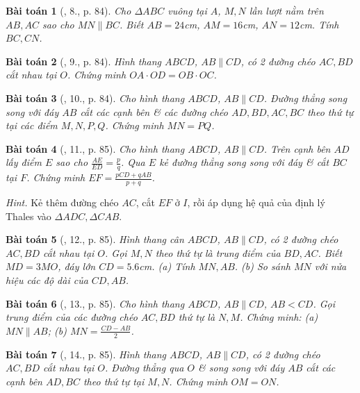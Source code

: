 \documentclass{article}
\newtheorem{baitoan}{Bài toán}
\begin{document}
\begin{baitoan}[\cite{SBT_Toan_8_tap_2}, 8., p. 84]
	Cho $\Delta ABC$ vuông tại $A$, $M,N$ lần lượt nằm trên $AB,AC$ sao cho $MN\parallel BC$. Biết $AB = 24$\emph{cm}, $AM = 16$\emph{cm}, $AN = 12$\emph{cm}. Tính $BC,CN$.
\end{baitoan}

\begin{baitoan}[\cite{SBT_Toan_8_tap_2}, 9., p. 84]
	Hình thang $ABCD$, $AB\parallel CD$, có 2 đường chéo $AC,BD$ cắt nhau tại $O$. Chứng minh $OA\cdot OD = OB\cdot OC$.
\end{baitoan}

\begin{baitoan}[\cite{SBT_Toan_8_tap_2}, 10., p. 84]
	Cho hình thang $ABCD$, $AB\parallel CD$. Đường thẳng song song với đáy $AB$ cắt các cạnh bên \& các đường chéo $AD,BD,AC,BC$ theo thứ tự tại các điểm $M,N,P,Q$. Chứng minh $MN = PQ$.
\end{baitoan}

\begin{baitoan}[\cite{SBT_Toan_8_tap_2}, 11., p. 85]
	Cho hình thang $ABCD$, $AB\parallel CD$. Trên cạnh bên $AD$ lấy điểm $E$ sao cho $\frac{AE}{ED} = \frac{p}{q}$. Qua $E$ kẻ đường thẳng song song với đáy \& cắt $BC$ tại $F$. Chứng minh $EF = \frac{pCD + qAB}{p + q}$.
\end{baitoan}
\noindent\textit{Hint.} Kẻ thêm đường chéo $AC$, cắt $EF$ ở $I$, rồi áp dụng hệ quả của định lý Thales vào $\Delta ADC,\Delta CAB$.

\begin{baitoan}[\cite{SBT_Toan_8_tap_2}, 12., p. 85]
	Hình thang cân $ABCD$, $AB\parallel CD$, có 2 đường chéo $AC,BD$ cắt nhau tại $O$. Gọi $M,N$ theo thứ tự là trung điểm của $BD,AC$. Biết $MD = 3MO$, đáy lớn $CD = 5.6$\emph{cm}. (a) Tính $MN,AB$. (b) So sánh $MN$ với nửa hiệu các độ dài của $CD,AB$.
\end{baitoan}

\begin{baitoan}[\cite{SBT_Toan_8_tap_2}, 13., p. 85]
	Cho hình thang $ABCD$, $AB\parallel CD$, $AB < CD$. Gọi trung điểm của các đường chéo $AC,BD$ thứ tự là $N,M$. Chứng minh: (a) $MN\parallel AB$; (b) $MN = \frac{CD - AB}{2}$.
\end{baitoan}

\begin{baitoan}[\cite{SBT_Toan_8_tap_2}, 14., p. 85]
	Hình thang $ABCD$, $AB\parallel CD$, có 2 đường chéo $AC,BD$ cắt nhau tại $O$. Đường thẳng qua $O$ \& song song với đáy $AB$ cắt các cạnh bên $AD,BC$ theo thứ tự tại $M,N$. Chứng minh $OM = ON$.
\end{baitoan}
\end{document}

